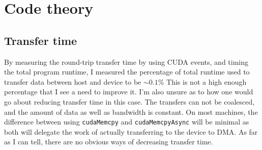 \documentclass[paper=a4, fontsize=11pt]{scrartcl} %
\numberwithin{equation}{section} %
\numberwithin{figure}{section} %
\numberwithin{table}{section} %
\begin{document}
\section{Code theory}

\subsection{Transfer time}

By measuring the round-trip transfer time by using CUDA events, and timing the total program runtime, I measured the percentage of total runtime used to transfer data between host and device to be $\sim0.1\%$
This is not a high enough percentage that I see a need to improve it. I'm also unsure as to how one would go about reducing transfer time in this case. The transfers can not be coalesced, and the amount of data as well as bandwidth is constant. On most machines, the difference between using \texttt{cudaMemcpy} and \texttt{cudaMemcpyAsync} will be minimal as both will delegate the work of actually transferring to the device to DMA. As far as I can tell, there are no obvious ways of decreasing transfer time.
\end{document}
